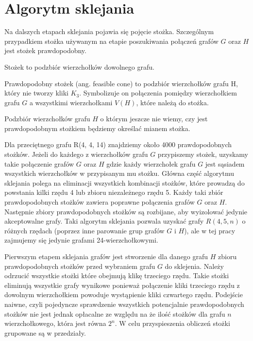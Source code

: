 \section{Algorytm sklejania}

Na dalszych etapach sklejania pojawia się pojęcie stożka. Szczególnym przypadkiem stożka używanym na etapie poszukiwania połączeń grafów $G$ oraz $H$ jest stożek prawdopodobny.

\begin{definition} Stożek to podzbiór wierzchołków dowolnego grafu.
\end{definition}

\begin{definition}
Prawdopodobny stożek (ang. feasible cone) to podzbiór wierzchołków grafu H, który nie tworzy kliki $K_3$\cite{mainpaper}. Symbolizuje on połączenia pomiędzy wierzchołkiem grafu $G$ a wszystkimi wierzchołkami $V(H)$, które należą do stożka.
\end{definition}

Podzbiór wierzchołków grafu $H$ o którym jeszcze nie wiemy, czy jest prawdopodobnym stożkiem będziemy  określać mianem stożka.

Dla przeciętnego grafu R(4, 4, 14) znajdziemy około 4000 prawdopodobnych stożków. Jeżeli do każdego z wierzchołków grafu $G$ przypiszemy stożek, uzyskamy takie połączenie grafów $G$ oraz $H$ gdzie każdy wierzchołek grafu $G$ jest sąsiadem wszystkich wierzchołków w przypisanym mu stożku. Główna część algorytmu sklejania polega na eliminacji wszystkich kombinacji stożków, które prowadzą do powstania kilki rzędu 4 lub zbioru niezależnego rzędu 5. Każdy taki zbiór prawdopodobnych stożków zawiera poprawne połączenia grafów $G$ oraz $H$. Następnie zbiory prawdopodobnych stożków są rozbijane, aby wyizolować jedynie akceptowalne grafy. Taki algorytm sklejania pozwala uzyskać grafy $R(4,5,n)$ o różnych rzędach (poprzez inne parowanie grup grafów $G$ i $H$), ale w tej pracy zajmujemy się jedynie grafami 24-wierzchołkowymi.

Pierwszym etapem sklejania grafów jest stworzenie dla danego grafu $H$ zbioru prawdopodobnych stożków przed wybraniem grafu $G$ do sklejenia. Należy odrzucić wszystkie stożki które obejmują klikę trzeciego rzędu. Takie stożki eliminują wszystkie grafy wynikowe ponieważ połączenie kliki trzeciego rzędu z dowolnym wierzchołkiem powoduje wystąpienie kliki czwartego rzędu. Podejście naiwne, czyli pojedyncze sprawdzenie wszystkich potencjalnie prawdopodobnych stożków nie jest jednak opłacalne ze względu na że ilość stożków dla grafu $n$ wierzchołkowego, która jest równa $2^n$. W celu przyspieszenia obliczeń stożki grupowane są w przedziały. 


